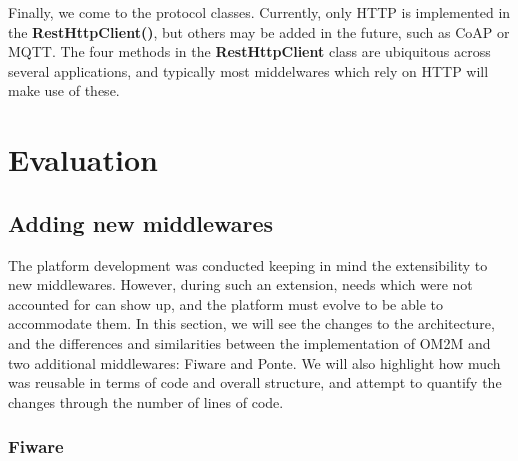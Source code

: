 \documentclass[conference]{IEEEtran}
\begin{document}
Finally, we come to the protocol classes. Currently, only HTTP is implemented in the \textbf{RestHttpClient()}, but others may be added in the future, such as CoAP or MQTT\@. The four methods in the \textbf{RestHttpClient} class are ubiquitous across several applications, and typically most middelwares which rely on HTTP will make use of these. 

\section{Evaluation}

\subsection{Adding new middlewares}

The platform development was conducted keeping in mind the extensibility to new middlewares. 
However, during such an extension, needs which were not accounted for can show up, and the platform must evolve to be able to accommodate them. In this section, we will see the changes to the architecture, and the differences and similarities between the implementation of OM2M and two additional middlewares: Fiware and Ponte. We will also highlight how much was reusable in terms of code and overall structure, and attempt to quantify the changes through the number of lines of code. 

\subsubsection{Fiware}
\end{document}
